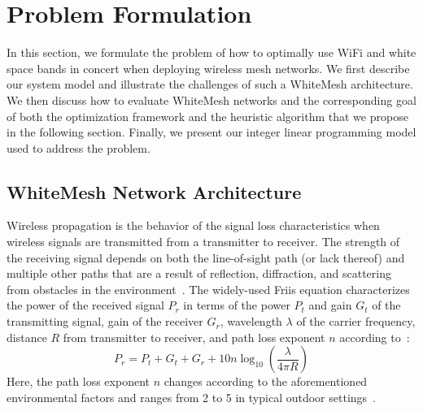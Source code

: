\section{Problem Formulation}
\label{sec:problemformulation}

%

In this section, we formulate the problem of how to optimally 
use WiFi and white space bands in concert when deploying wireless 
mesh networks.  We first describe our system model and illustrate 
the challenges of such a WhiteMesh architecture.  We then discuss
how to evaluate WhiteMesh networks and the corresponding goal of
both the optimization framework and the heuristic algorithm that 
we propose in the following section.  Finally, we present 
our integer linear programming model used to address the problem. 
 
\subsection{WhiteMesh Network Architecture}
\label{subsec:architecture}

Wireless propagation is the behavior of the signal loss characteristics 
when wireless signals are transmitted from a transmitter to receiver.
The strength of the receiving signal depends on both the line-of-sight
path (or lack thereof) and multiple other paths that are a result of 
reflection, diffraction, and scattering from obstacles in the 
environment~\cite{andersen1995propagation}. The widely-used Friis
equation characterizes the power of the received signal $P_r$ in terms 
of the power $P_t$ and gain $G_t$ of the transmitting signal, gain of 
the receiver $G_r$, wavelength $\lambda$ of the carrier frequency, 
distance $R$ from transmitter to receiver, and path loss exponent $n$ according 
to~\cite{friis}:
\begin{equation}
\label{eq:friis}
P_r=P_t+G_t+G_r+10n \log_{10}\left( \frac{\lambda}{4\pi R}\right)
\end{equation}
Here, the path loss exponent $n$ changes according to the
aforementioned environmental factors and ranges from 2 to 5 in typical
outdoor settings~\cite{rappaport}.

